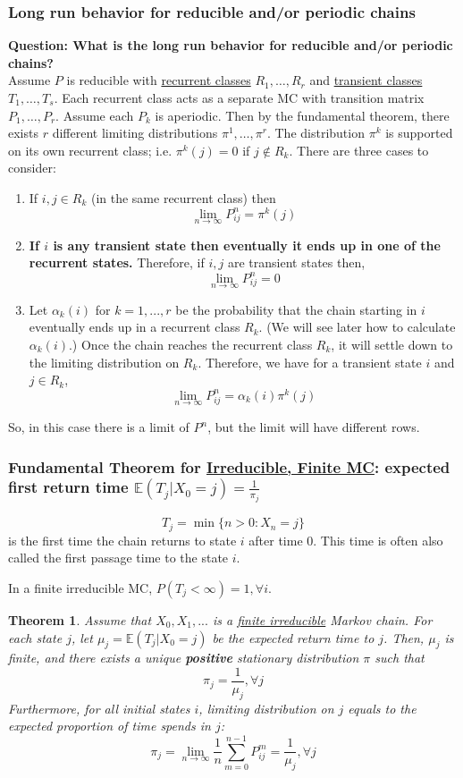 \documentclass[11pt,a4paper]{article}
\newtheorem{theorem}{Theorem}
\begin{document}
\subsubsection{Long run behavior for reducible and/or periodic chains}
\textbf{Question: What is the long run behavior for reducible and/or periodic chains?}\\
Assume $P$ is reducible with \underline{recurrent classes} $R_1, \ldots, R_r$ and \underline{transient classes} $T_1, \ldots, T_s$. Each recurrent class acts as a separate $\mathrm{MC}$ with transition matrix $P_1, \ldots, P_r$. Assume each $P_k$ is aperiodic. Then by the fundamental theorem, there exists $r$ different limiting distributions $\pi^1, \ldots, \pi^r$. The distribution $\pi^k$ is supported on its own recurrent class; i.e. $\pi^k(j)=0$ if $j \notin R_k .$ There are three cases to consider:
\begin{enumerate}
    \item If $i,j\in R_k$ (in the same recurrent class) then $$\lim_{n \rightarrow \infty}P_{ij}^n=\pi^k(j)$$
    \item \textbf{If $i$ is any transient state then eventually it ends up in one of the recurrent states.} Therefore, if $i,j$ are transient states then, $$\lim_{n \rightarrow \infty}P_{ij}^n=0$$
    \item Let $\alpha_k(i)$ for $k = 1,...,r$ be the probability that the chain starting in $i$ eventually ends up in a recurrent class $R_k$. (We will see later how to calculate $\alpha_k(i)$.) Once the chain reaches the recurrent class $R_k$, it will settle down to the limiting distribution on $R_k$. Therefore, we have for a transient state $i$ and $j \in R_k$, $$\lim_{n \rightarrow \infty}P_{ij}^n=\alpha_k(i)\pi^k(j)$$
\end{enumerate}
So, in this case there is a limit of $P^n$, but the limit will have different rows.


\subsubsection{Fundamental Theorem for \underline{Irreducible, Finite MC}: expected first return time $\mathbb{E}(T_j|X_0 = j)=\frac{1}{\pi_j}$}
$$T_j=\min\{n>0 : X_n = j\}$$ is the first time the chain returns to state $i$ after time $0$. This time is often also called the first passage time to the state $i$.

In a finite irreducible MC, $P(T_j<\infty)=1,\forall i$.
\begin{theorem}
    Assume that $X_0, X_1,...$ is a \underline{finite irreducible} Markov chain. For each state $j$, let $\mu_j = \mathbb{E}(T_j|X_0 = j)$ be the expected return time to $j$. Then, $\mu_j$ is finite, and there exists a unique \textbf{positive} stationary distribution $\pi$ such that $$\pi_j=\frac{1}{\mu_j},\forall j$$
    Furthermore, for all initial states $i$, limiting distribution on $j$ equals to the expected proportion of time spends in $j$: $$\pi_j=\lim_{n \rightarrow \infty}\frac{1}{n}\sum_{m=0}^{n-1}P_{ij}^m=\frac{1}{\mu_j},\forall j$$
\end{theorem}
\end{document}
